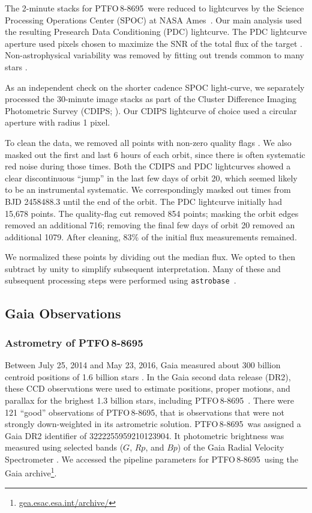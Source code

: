 \documentclass[12pt,twocolumn,tighten]{aastex62}
\newcommand{\ptfo}{PTFO$\,$8-8695}
\begin{document}
The 2-minute stacks for \ptfo\ were reduced to lightcurves by the
Science Processing Operations Center (SPOC) at NASA
Ames~\citep{jenkins_tess_2016}.  Our main analysis used the resulting
Presearch Data Conditioning (PDC) lightcurve.  The PDC lightcurve
aperture used pixels chosen to maximize the SNR of the total flux of
the target \citep{smith_kepler_apertures_2017}.  Non-astrophysical
variability was removed by fitting out trends common to many stars
\citep{smith_kepler_PDC_2017}.

As an independent check on the shorter cadence SPOC light-curve, we
separately processed the 30-minute image stacks as part of the Cluster
Difference Imaging Photometric Survey (CDIPS;
\citealt{bouma_cluster_2019}).  Our CDIPS lightcurve  of choice used a
circular aperture with radius 1 pixel.

To clean the data, we removed all points with non-zero quality flags
\citep[{\it e.g.},][]{tess_data_product_description_2018}.  We also
masked out the first and last 6 hours of each orbit, since there is
often systematic red noise during those times.  Both the CDIPS and PDC
lightcurves showed a clear discontinuous ``jump'' in the last few days
of orbit 20, which seemed likely to be an instrumental systematic.  We
correspondingly masked out times from BJD 2458488.3 until the end of
the orbit.  The PDC lightcurve initially had 15{,}678 points.  The
quality-flag cut removed 854 points; masking the orbit edges removed an
additional 716; removing the final few days of orbit 20 removed an
additional 1079.  After cleaning, 83\% of the initial flux
measurements remained.

We normalized these points by dividing out the median flux. We opted
to then subtract by unity to simplify subsequent interpretation.  Many
of these and subsequent processing steps were performed using
\texttt{astrobase}~\citep{bhatti_astrobase_2018}. 


\subsection{Gaia Observations}

\subsubsection{Astrometry of \ptfo}

Between July 25, 2014 and May 23, 2016, Gaia measured about 300
billion centroid positions of 1{.}6 billion stars
\citep{gaia_collaboration_gaia_2016,lindegren_gaiasoln_2018,gaia_collaboration_gaia_2018}.
In the Gaia second data release (DR2), these CCD observations were
used to estimate positions, proper motions, and parallax for the
brighest 1{.}3 billion stars, including \ptfo\
\citep{lindegren_gaiasoln_2018}.  There were 121 ``good'' observations
of \ptfo, that is observations that were not strongly down-weighted in
its astrometric solution.  \ptfo\ was assigned a Gaia DR2 identifier
of 3222255959210123904.  It photometric brightness was measured using
selected bands ($G$, $Rp$, and $Bp$) of the Gaia Radial Velocity
Spectrometer \citep{cropper_gaia_2018,evans_gaia_2018}.  We accessed
the pipeline parameters for \ptfo\ using the Gaia
archive\footnote{\url{gea.esac.esa.int/archive/}}.
\end{document}
